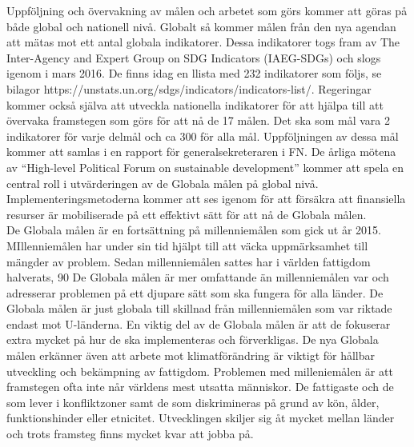 \documentclass{report}
\begin{document}
Uppföljning och övervakning av målen och arbetet som görs kommer att göras på både global och nationell nivå. Globalt så kommer målen från den nya agendan att mätas mot ett antal globala indikatorer. Dessa indikatorer togs fram av The Inter-Agency and Expert Group on SDG Indicators (IAEG-SDGs) och slogs igenom i mars 2016. \cite{web2030agenda}
De finns idag en llista med 232 indikatorer som följs, se bilagor https://unstats.un.org/sdgs/indicators/indicators-list/.
Regeringar kommer också själva att utveckla nationella indikatorer för att hjälpa till att övervaka framstegen som görs för att nå de 17 målen. Det ska som mål vara 2 indikatorer för varje delmål och ca 300 för alla mål. Uppföljningen av dessa mål kommer att samlas i en rapport för generalsekreteraren i FN. De årliga mötena av  “High-level Political Forum on sustainable development” kommer att spela en central roll i utvärderingen av de Globala målen på global nivå. Implementeringsmetoderna kommer att ses igenom för att försäkra att finansiella resurser är mobiliserade på ett effektivt sätt för att nå de Globala målen.  \cite{web2030agenda}\\




De Globala målen är en fortsättning på millenniemålen som gick ut år 2015. MIllenniemålen har under sin tid hjälpt till att väcka uppmärksamhet till mängder av problem. Sedan millenniemålen sattes har i världen fattigdom halverats, 90%
De Globala målen är mer omfattande än millenniemålen var och adresserar problemen på ett djupare sätt som ska fungera för alla länder. De Globala målen är just globala till skillnad från millenniemålen som var riktade endast mot U-länderna. En viktig del av de Globala målen är att de fokuserar extra mycket på hur de ska implementeras och förverkligas. De nya Globala målen erkänner även att arbete mot klimatförändring är viktigt för hållbar utveckling och bekämpning av fattigdom. \cite{web2030agenda}
Problemen med milleniemålen är att framstegen ofta inte når världens mest utsatta människor. De fattigaste och de som lever i konfliktzoner samt de som diskrimineras på grund av kön, ålder, funktionshinder eller etnicitet. Utvecklingen skiljer sig åt mycket mellan länder och trots framsteg finns mycket kvar att jobba på. \\
\end{document}
